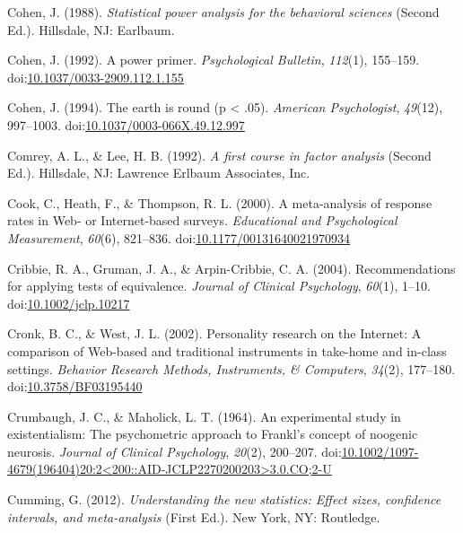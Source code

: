 \documentclass[english,man]{apa6}
\theoremstyle{definition}
\theoremstyle{definition}
\theoremstyle{definition}
\theoremstyle{remark}
\begin{document}
\hypertarget{ref-Cohen1988}{}
Cohen, J. (1988). \emph{Statistical power analysis for the behavioral
sciences} (Second Ed.). Hillsdale, NJ: Earlbaum.

\hypertarget{ref-Cohen1992a}{}
Cohen, J. (1992). A power primer. \emph{Psychological Bulletin},
\emph{112}(1), 155--159.
doi:\href{https://doi.org/10.1037/0033-2909.112.1.155}{10.1037/0033-2909.112.1.155}

\hypertarget{ref-Cohen1994}{}
Cohen, J. (1994). The earth is round (p \textless{} .05). \emph{American
Psychologist}, \emph{49}(12), 997--1003.
doi:\href{https://doi.org/10.1037/0003-066X.49.12.997}{10.1037/0003-066X.49.12.997}

\hypertarget{ref-Comrey1992}{}
Comrey, A. L., \& Lee, H. B. (1992). \emph{A first course in factor
analysis} (Second Ed.). Hillsdale, NJ: Lawrence Erlbaum Associates, Inc.

\hypertarget{ref-Cook2000}{}
Cook, C., Heath, F., \& Thompson, R. L. (2000). A meta-analysis of
response rates in Web- or Internet-based surveys. \emph{Educational and
Psychological Measurement}, \emph{60}(6), 821--836.
doi:\href{https://doi.org/10.1177/00131640021970934}{10.1177/00131640021970934}

\hypertarget{ref-Cribbie2004}{}
Cribbie, R. A., Gruman, J. A., \& Arpin-Cribbie, C. A. (2004).
Recommendations for applying tests of equivalence. \emph{Journal of
Clinical Psychology}, \emph{60}(1), 1--10.
doi:\href{https://doi.org/10.1002/jclp.10217}{10.1002/jclp.10217}

\hypertarget{ref-Cronk2002}{}
Cronk, B. C., \& West, J. L. (2002). Personality research on the
Internet: A comparison of Web-based and traditional instruments in
take-home and in-class settings. \emph{Behavior Research Methods,
Instruments, \& Computers}, \emph{34}(2), 177--180.
doi:\href{https://doi.org/10.3758/BF03195440}{10.3758/BF03195440}

\hypertarget{ref-Crumbaugh1964}{}
Crumbaugh, J. C., \& Maholick, L. T. (1964). An experimental study in
existentialism: The psychometric approach to Frankl's concept of
noogenic neurosis. \emph{Journal of Clinical Psychology}, \emph{20}(2),
200--207.
doi:\href{https://doi.org/10.1002/1097-4679(196404)20:2\%3C200::AID-JCLP2270200203\%3E3.0.CO;2-U}{10.1002/1097-4679(196404)20:2\textless{}200::AID-JCLP2270200203\textgreater{}3.0.CO;2-U}

\hypertarget{ref-Cumming2012}{}
Cumming, G. (2012). \emph{Understanding the new statistics: Effect
sizes, confidence intervals, and meta-analysis} (First Ed.). New York,
NY: Routledge.
\end{document}
